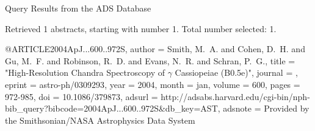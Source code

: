 Query Results from the ADS Database


Retrieved 1 abstracts, starting with number 1.  Total number selected: 1.

@ARTICLE{2004ApJ...600..972S,
   author = {{Smith}, M.~A. and {Cohen}, D.~H. and {Gu}, M.~F. and {Robinson}, R.~D. and 
	{Evans}, N.~R. and {Schran}, P.~G.},
    title = "{High-Resolution Chandra Spectroscopy of {$\gamma$} Cassiopeiae (B0.5e)}",
  journal = {\apj},
   eprint = {astro-ph/0309293},
     year = 2004,
    month = jan,
   volume = 600,
    pages = {972-985},
      doi = {10.1086/379873},
   adsurl = {http://adsabs.harvard.edu/cgi-bin/nph-bib_query?bibcode=2004ApJ...600..972S&db_key=AST},
  adsnote = {Provided by the Smithsonian/NASA Astrophysics Data System}
}


